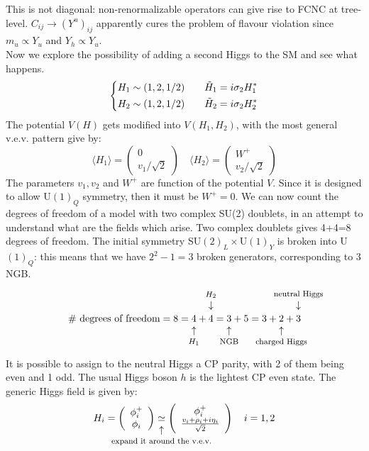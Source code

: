 \documentclass[../main.tex]{subfiles}
\begin{document}
This is not diagonal: non-renormalizable operators can give rise to FCNC at tree-level. $C_{ij}\xrightarrow[]{}(Y^u)_{ij}$ apparently cures the problem of flavour violation since $m_u\propto Y_u$ and $Y_h\propto Y_u$.\\
Now we explore the possibility of adding a second Higgs to the SM and see what happens. 
\[
\left\{
\begin{aligned}
&H_1\sim(1,2,1/2) \quad &&\Tilde{H}_1=i\sigma_2H_1^*\\
&H_2\sim(1,2,1/2) \quad &&\Tilde{H}_2=i\sigma_2H_2^*
\end{aligned}
\right.
\]
The potential $V(H)$ gets modified into $V(H_1,H_2)$, with the most general v.e.v. pattern give by:
\[
\langle H_1 \rangle=\left(\begin{array}{c}
     0 \\
     v_1/\sqrt{2}
\end{array}\right)
\quad
\langle H_2 \rangle=\left(\begin{array}{c}
     W^+ \\
     v_2/\sqrt{2}
\end{array}\right)
\]
The parameters $v_1, v_2$ and $W^+$ are function of the potential $V$. Since it is designed to allow U$(1)_Q$ symmetry, then it must be $W^+=0$. We can now count the degrees of freedom of a model with two complex SU(2) doublets, in an attempt to understand what are the fields which arise. Two complex doublets gives 4+4=8 degrees of freedom. The initial symmetry SU$(2)_L\times$U$(1)_Y$ is broken into U$(1)_Q$: this means that we have $2^2-1=3$ broken generators, corresponding to 3 NGB.
\[
\text{\# degrees of freedom}=8=\underset{\mathclap{\tikz \node {$\uparrow$} node [below=1ex] {\footnotesize $H_1$ };}}{4}+\overset{\mathclap{\tikz \node {$\downarrow$} node [above=1ex] {\footnotesize $H_2$};}}{4}=\underset{\mathclap{\tikz \node {$\uparrow$} node [below=1ex] {\footnotesize  NGB};}}{3}+5=3+\underset{\mathclap{\tikz \node {$\uparrow$} node [below=1ex] {\footnotesize charged Higgs };}}{2}+\overset{\mathclap{\tikz \node {$\downarrow$} node [above=1ex] {\footnotesize neutral Higgs };}}3
\]
It is possible to assign to the neutral Higgs a CP parity, with 2 of them being even and 1 odd. The usual Higgs boson $h$ is the lightest CP even state. The generic Higgs field is given by:
\[
H_i=\left(\begin{array}{c}
    \phi_i^+\\
    \phi_i
\end{array}\right)
\underset{\mathclap{\tikz \node {$\uparrow$} node [below=1ex] {\footnotesize expand it around the v.e.v. };}}{\simeq}
\left(\begin{array}{c}
    \phi_i^+\\
    \frac{v_i+\rho_i+i\eta_i}{\sqrt{2}}
\end{array}\right)
\quad
i=1,2
\]
\end{document}
